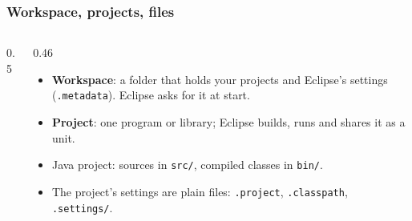 \documentclass[aspectratio=169,10pt,compress]{beamer}
\begin{document}
\begin{frame}[t,fragile] \frametitle{Workspace, projects, files}
  \begin{columns}[T]
    \begin{column}{0.5\textwidth}
      \begin{center}
      \end{center}
    \end{column}
    \begin{column}{0.46\textwidth}
      \begin{itemize}\small
        \item \textbf{Workspace}: a folder that holds your projects and Eclipse's settings (\texttt{.metadata}).
              Eclipse asks for it at start.
        \item \textbf{Project}: one program or library; Eclipse builds, runs and shares it as a unit.
        \item Java project: sources in \texttt{src/}, compiled classes in \texttt{bin/}.
        \item The project's settings are plain files: \texttt{.project}, \texttt{.classpath}, \texttt{.settings/}.
      \end{itemize}
    \end{column}
  \end{columns}
\end{frame}
\end{document}

